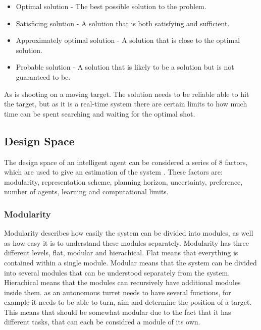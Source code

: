 \begin{itemize}
  \item Optimal solution - The best possible solution to the problem.
  \item Satisficing solution - A solution that is both satisfying and
  sufficient.
  \item Approximately optimal solution - A solution that is close to the optimal
  solution.
  \item Probable solution - A solution that is likely to be a solution but is
  not guaranteed to be.
\end{itemize}

As \name is shooting on a moving target. The solution needs to be reliable able
to hit the target, but as it is a real-time system there are certain limits to
how much time can be spent searching and waiting for the optimal shot.

\subsection{Design Space}
The design space of an intelligent agent can be considered a series of 8
factors, which are used to give an estimation of the system \citep[Chap
1.5]{MIBook}. These factors are: modularity, representation scheme, planning
horizon, uncertainty, preference, number of agents, learning and computational
limits.

\subsubsection{Modularity}
Modularity describes how easily the system can be divided into modules, as well
as how easy it is to understand these modules separately. Modularity has three
different levels, flat, modular and hierachical. Flat means that everything is
contained within a single module. Modular means that the system can be divided
into several modules that can be understood separately from the system.
Hierachical means that the modules can recursively have additional modules
inside them. \name as an autonomous turret needs to have several functions, for
example it needs to be able to turn, aim and determine the position of a target.
This means that \name should be somewhat modular due to the fact that it has
different tasks, that can each be considred a module of its own.

